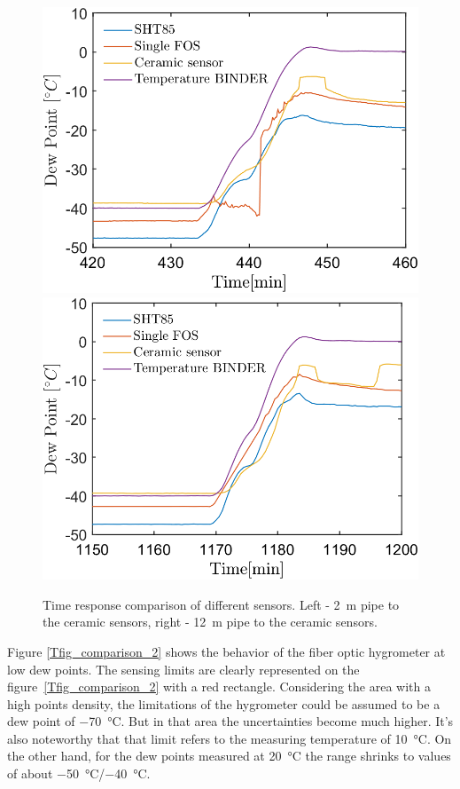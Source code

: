 \begin{figure}[!h]
\centering
\includegraphics[width=0.47\columnwidth]{Chapter5/images/DPCPercent_response2m.png}
\includegraphics[width=0.47\columnwidth]{Chapter5/images/DPCPercent_response12m.png}
\caption{Time response comparison of different sensors. Left - \SI{2}{\metre} pipe to the ceramic sensors, right - \SI{12}{\metre} pipe to the ceramic sensors.}
\label{fig_comparison}
\end{figure}
\newpage
Figure \ref{Tfig_comparison_2} shows the behavior of the fiber optic hygrometer at low dew points. The sensing limits are clearly represented on the figure~\ref{Tfig_comparison_2} with a red rectangle. Considering the area with a high points density, the limitations of the hygrometer could be assumed to be a dew point of \SI{-70}{\celsius}. But in that area the uncertainties become much higher. It's also noteworthy that that limit refers to the measuring temperature of \SI{10}{\celsius}. On the other hand, for the dew points measured at \SI{20}{\celsius} the range shrinks to values of about \SI{-50}{\celsius}/\SI{-40}{\celsius}.

